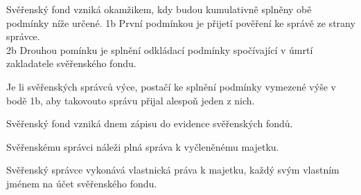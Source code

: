 \documentclass[parskip=half]{scrreprt}
\begin{document}
\begin{contract}

Svěřenský fond vzniká okamžikem, kdy budou kumulativně splněny obě podmínky níže určené.
1b První podmínkou je přijetí pověření ke správě ze strany správce.\\
2b Drouhou pomínku je splnění odkládací podmínky spočívající v úmrtí zakladatele svěřenského fondu.


Je li svěřenských správců výce, postačí ke splnění podmínky vymezené výše v bodě 1b, aby takovouto správu přijal alespoň jeden z nich.



Svěřenský fond vzniká dnem zápisu do evidence svěřenských fondů.




Svěřenskému správci náleži plná správa k vyčleněnému majetku.

Svěřenský správce vykonává vlastnická práva k majetku, každý svým vlastním jménem na účet svěřenského fondu.





\end{contract}
\end{document}
